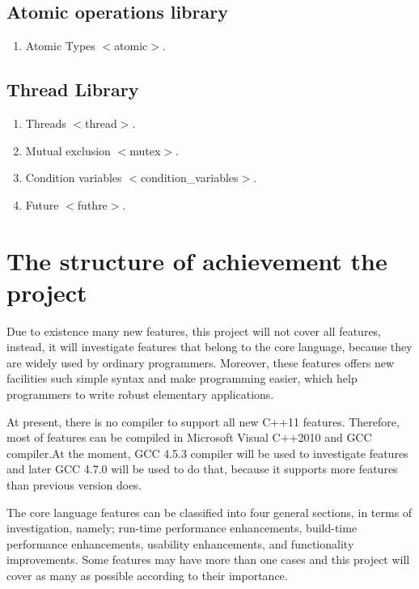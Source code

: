 \documentclass[11pt]{report}
\begin{document}
\subsection{Atomic operations library}
\label{sub-section:	Atomic operations library}
\begin{enumerate}
\item Atomic Types $<$atomic$>$.
\end{enumerate}

\subsection{Thread Library }
\label{sub-section: Thread library }
\begin{enumerate}
\item Threads $<$thread$>$.
\item Mutual exclusion $<$mutex$>$.
\item Condition variables $<$condition\_variables$>$.
\item Future $<$futhre$>$.
\end{enumerate}


\section{The structure of achievement  the project}
\label{section:The structure of achievement  the project}
Due to existence many new features, this project will not cover all features, instead, it will investigate features that belong to the core language, because they are widely used by ordinary programmers.  Moreover, these features offers new facilities such simple syntax and make programming easier, which help programmers to write robust elementary applications.

At present, there is no compiler to support all new C++11 features. Therefore, most of features can be compiled in Microsoft Visual C++2010 and GCC compiler.At the moment,  GCC 4.5.3  compiler will be used to investigate features and later GCC 4.7.0 will be used to do that, because it supports more features than previous version does.

The core language features can be classified into four general sections, in terms of investigation, namely; run-time performance enhancements, build-time performance enhancements, usability enhancements, and functionality improvements. Some features may have more than one cases and this project will cover as many as possible according to their importance.
\end{document}
